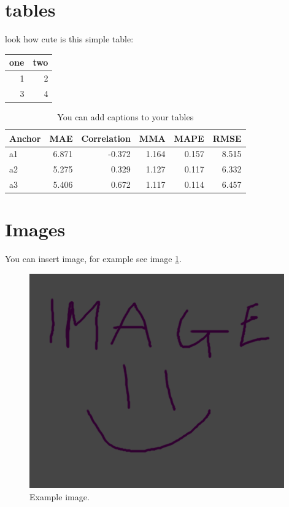 \section{tables}
\label{sec:org66f5584}

look how cute is this simple table:

\begin{center}
\begin{tabular}{rr}
one & two\\
\hline
1 & 2\\
3 & 4\\
\end{tabular}
\end{center}

\begin{table}[htbp]
\caption{\label{tab:org19b9ae9}
You can add captions to your tables}
\centering
\begin{tabular}{lrrrrr}
Anchor & MAE & Correlation & MMA & MAPE & RMSE\\
\hline
a1 & 6.871 & -0.372 & 1.164 & 0.157 & 8.515\\
a2 & 5.275 & 0.329 & 1.127 & 0.117 & 6.332\\
a3 & 5.406 & 0.672 & 1.117 & 0.114 & 6.457\\
\end{tabular}
\end{table}

\section{Images}
\label{sec:org9bdd49c}
You can insert image, for example see image \ref{fig:org5e35451}.

\begin{figure}[htbp]
\centering
\includegraphics[width=.9\linewidth]{./img/example_image.png}
\caption{\label{fig:org5e35451}
Example image.}
\end{figure}

